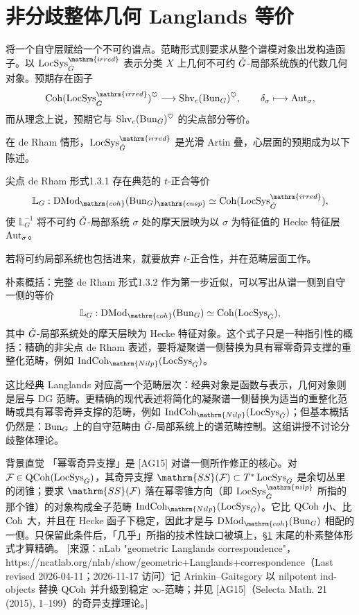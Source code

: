 \section{非分歧整体几何 Langlands 等价}\label{sec:1.3}
将一个自守层赋给一个不可约谱点。范畴形式则要求从整个谱模对象出发构造函子。以 $\LocSys_{\checkG}^{\mathrm{irred}}$ 表示分类 $X$ 上几何不可约 $\check{G}$-局部系统族的代数几何对象。预期存在函子
\[\Coh(\LocSys_{\checkG}^{\mathrm{irred}})^\heartsuit\longrightarrow\Shv_c(\Bun_G)^\heartsuit,\qquad\delta_\sigma\longmapsto\Aut_\sigma,\]
而从理念上说，预期它与 $\operatorname{Shv}_c(\operatorname{Bun}_G)^\heartsuit$ 的尖点部分等价。

在 de Rham 情形，$\LocSys_{\checkG}^{\mathrm{irred}}$ 是光滑 Artin 叠，心层面的预期成为以下陈述。
\begin{conjecture}{尖点 de Rham 形式}{1.3.1}
存在典范的 $t$-正合等价
\[\mathbb L_G:\DMod_{\mathrm{coh}}(\Bun_G)_{\mathrm{cusp}}\simeq\Coh(\LocSys_{\checkG}^{\mathrm{irred}}),\]
使 $\mathbb L_G^{-1}$ 将不可约 $\check{G}$-局部系统 $\sigma$ 处的摩天层映为以 $\sigma$ 为特征值的 Hecke 特征层 $\operatorname{Aut}_\sigma$。
\end{conjecture}

若将可约局部系统也包括进来，就要放弃 $t$-正合性，并在范畴层面工作。
\begin{theorem}{朴素概括：完整 de Rham 形式}{1.3.2}
作为第一步近似，可以写出从谱一侧到自守一侧的等价
\[\mathbb L_G:\DMod_{\mathrm{coh}}(\Bun_G)\simeq\Coh(\LocSys_{\checkG}),\]
其中 $\check{G}$-局部系统处的摩天层映为 Hecke 特征对象。这个式子只是一种指引性的概括：精确的非尖点 de Rham 表述，要将凝聚谱一侧替换为具有幂零奇异支撑的重整化范畴，例如 $\IndCoh_{\mathrm{Nilp}}(\LocSys_{\checkG})$。
\end{theorem}

这比经典 Langlands 对应高一个范畴层次：经典对象是函数与表示，几何对象则是层与 DG 范畴。更精确的现代表述将简化的凝聚谱一侧替换为适当的重整化范畴或具有幂零奇异支撑的范畴，例如 $\IndCoh_{\mathrm{Nilp}}(\LocSys_{\checkG})$\cite{AG15,GR24a}；但基本概括仍然是：$\operatorname{Bun}_G$ 上的自守范畴由 $\check{G}$-局部系统上的谱范畴控制。这组讲授不讨论分歧整体理论。

\begin{transnote}{背景直觉}
「幂零奇异支撑」是 [AG15] 对谱一侧所作修正的核心。对 $\mathcal{F}\in\operatorname{QCoh}(\operatorname{LocSys}_{\check{G}})$，其奇异支撑 $\mathrm{SS}(\cF)\subset T^*\LocSys_{\checkG}$ 是余切丛里的闭锥；要求 $\mathrm{SS}(\cF)$ 落在幂零锥方向（即 $\LocSys^{\mathrm{nilp}}_{\checkG}$ 所指的那个锥）的对象构成全子范畴 $\IndCoh_{\mathrm{Nilp}}(\LocSys_{\checkG})$。它比 $\operatorname{QCoh}$ 小、比 $\operatorname{Coh}$ 大，并且在 Hecke 函子下稳定，因此才是与 $\DMod_{\mathrm{coh}}(\Bun_G)$ 相配的一侧。只保留此条件后，「几乎」所指的技术性缺口被填上，\S\ref{sec:1.3} 末尾的朴素整体形式才算精确。
[来源：nLab "geometric Langlands correspondence"，https://ncatlab.org/nlab/show/geometric+Langlands+correspondence（Last revised 2026-04-11；2026-11-17 访问）记 Arinkin–Gaitsgory 以 nilpotent ind-objects 替换 $\operatorname{QCoh}$ 并升级到稳定 $\infty$-范畴；并见 [AG15]（Selecta Math. 21 (2015), 1–199）的奇异支撑理论。]
\end{transnote}


